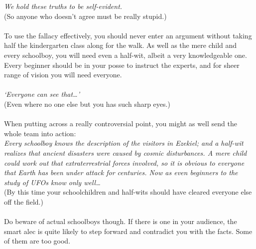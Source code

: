 \documentclass[a4paper,12pt,single,pdftex]{scrartcl}
\begin{document}
    
      {\em We hold these truths to be self-evident.}
    \\

    
      (So anyone who doesn’t agree must be really stupid.)
    \\

    
       
    \\

    
      To use the fallacy effectively, you should never enter an argument without taking half the kindergarten class along for the walk. As well as the mere child and every schoolboy, you will need even a half-wit, albeit a very knowledgeable one. Every beginner should be in your posse to instruct the experts, and for sheer range of vision you will need everyone.
    \\

    
       
    \\

    
      {\em ‘Everyone can see that…’}
    \\

    
      (Even where no one else but you has such sharp eyes.)
    \\

    
       
    \\

    
      When putting across a really controversial point, you might as well send the whole team into action:
    \\

    
      {\em Every schoolboy knows the description of the visitors in Ezekiel; and a half-wit realizes that ancient disasters were caused by cosmic disturbances. A mere child could work out that extraterrestrial forces involved, so it is obvious to everyone that Earth has been under attack for centuries. Now as even beginners to the study of UFOs know only well…}
    \\

    
      (By this time your schoolchildren and half-wits should have cleared everyone else off the field.)
    \\

    
       
    \\

    
      Do beware of actual schoolboys though. If there is one in your audience, the smart alec is quite likely to step forward and contradict you with the facts. Some of them are too good.
    \\
\end{document}
